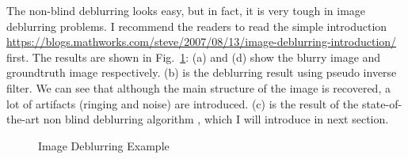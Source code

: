 \documentclass[journal, onecolumn, 10pt]{IEEEtran}
\begin{document}
The non-blind deblurring looks easy, but in fact, it is very tough in image deblurring problems. I recommend the readers to read the simple introduction \cite{deblurintro}\url{https://blogs.mathworks.com/steve/2007/08/13/image-deblurring-introduction/} first. The results are shown in Fig.~\ref*{fig:simple_inverse_filter}: (a) and (d) show the blurry image and groundtruth image respectively. (b) is the deblurring result using pseudo inverse filter. We can see that although the main structure of the image is recovered, a lot of artifacts (ringing and noise) are introduced. (c) is the result of the state-of-the-art non blind deblurring algorithm \cite{krishnan2009fast}, which I will introduce in next section.

\begin{figure}[h!]
\centering
{}
\hspace{\fill}
\hspace{\fill}
\hspace{\fill}
\hspace{\fill}
\caption{Image Deblurring Example}
\label{fig:simple_inverse_filter}
\end{figure}
\end{document}
